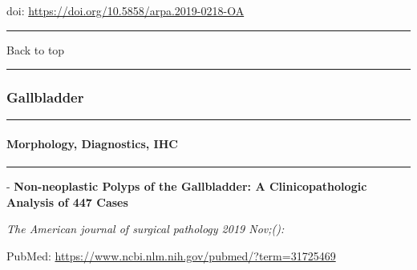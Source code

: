 \documentclass[
]{article}
\renewcommand{\linethickness}{0.05em}
\begin{document}
doi: \url{https://doi.org/10.5858/arpa.2019-0218-OA}

\begin{center}\rule{0.5\linewidth}{\linethickness}\end{center}

Back to top

\begin{center}\rule{0.5\linewidth}{\linethickness}\end{center}

\pagebreak

\hypertarget{gallbladder}{%
\subsubsection{Gallbladder}\label{gallbladder}}

\begin{center}\rule{0.5\linewidth}{\linethickness}\end{center}

\hypertarget{gallbladder_morphology}{%
\paragraph{Morphology, Diagnostics, IHC}\label{gallbladder_morphology}}

\begin{center}\rule{0.5\linewidth}{\linethickness}\end{center}

- \textbf{Non-neoplastic Polyps of the Gallbladder: A Clinicopathologic
Analysis of 447 Cases}

\emph{The American journal of surgical pathology 2019 Nov;():}

PubMed: \url{https://www.ncbi.nlm.nih.gov/pubmed/?term=31725469}
\end{document}
